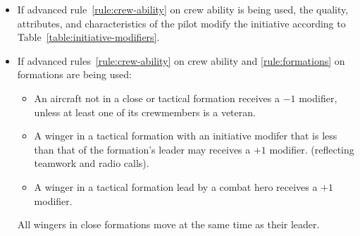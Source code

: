 {\begin{itemize}
    \item{} If advanced rule~\ref{rule:crew-ability} on crew ability is being used, the quality, attributes, and characteristics of the pilot modify the initiative according to Table~\ref{table:initiative-modifiers}.

	\item{} If advanced rules~\ref{rule:crew-ability} on crew ability and \ref{rule:formations} on formations are being used:
    \begin{itemize}
        \item An aircraft not in a close or tactical formation receives a $-1$ modifier, unless at least one of its crewmembers is a veteran.
        \item A winger in a tactical formation with an initiative modifer that is less than that of the formation’s leader may  receives a $+1$ modifier. (reflecting teamwork and radio calls).
        \item A winger in a tactical formation lead by a combat hero receives a $+1$ modifier.
    \end{itemize}
    All wingers in close formations move at the same time as their leader.
\end{itemize}

}


